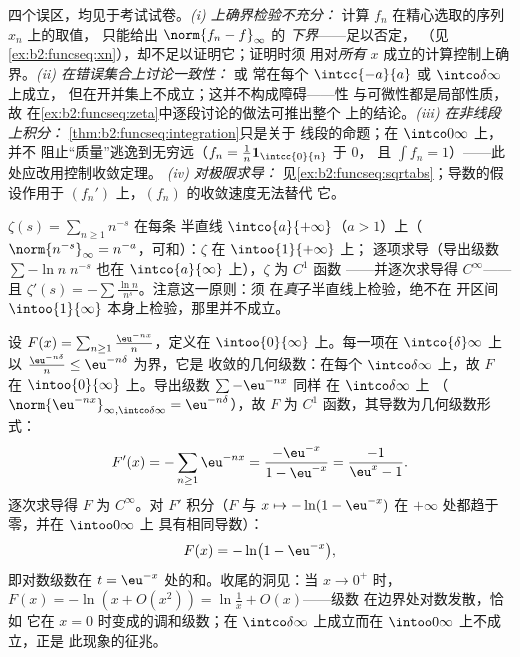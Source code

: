 \begin{remark}[常见误区]
四个误区，均见于考试试卷。\emph{(i)
上确界检验不充分：} 计算 $f_n$ 在精心选取的序列 $x_n$ 上的取值，
只能给出 $\norm{f_n - f}_\infty$ 的
\emph{下界}——足以否定，
（见\cref{ex:b2:funcseq:xn}），却不足以证明它；证明时须
用对\emph{所有} $x$ 成立的计算控制上确界。\emph{(ii)
在错误集合上讨论一致性：} 或
常在每个 $\intcc{-a}{a}$ 或 $\intco\delta\infty$ 上成立，
但在开并集上不成立；这并不构成障碍——性
与可微性都是局部性质，故
在\cref{ex:b2:funcseq:zeta}中逐段讨论的做法可推出整个
上的结论。\emph{(iii) 在非线段上积分：}
\cref{thm:b2:funcseq:integration}只是关于
线段的命题；在 $\intco0\infty$ 上，并不
阻止“质量”逃逸到无穷远（$f_n =
\frac1n\mathbf 1_{\intcc{0}{n}}$ 于 $0$，
且 $\int f_n = 1$）——此处应改用控制收敛定理。
\emph{(iv) 对极限求导：}
见\cref{ex:b2:funcseq:sqrtabs}；导数的假设作用于
$(f_n')$ 上，$(f_n)$ 的收敛速度无法替代
它。
\end{remark}

\begin{example}[黎曼 $\zeta$ 函数]\label{ex:b2:funcseq:zeta}
$\zeta(s) = \sum_{n\geq1} n^{-s}$ 在每条
半直线 $\intco{a}{+\infty}$（$a > 1$）上（$\norm{n^{-s}}_\infty =
n^{-a}$，可和）：$\zeta$ 在 $\intoo{1}{+\infty}$ 上；
逐项求导（导出级数 $\sum -\ln n\; n^{-s}$
也在 $\intco{a}{\infty}$ 上），$\zeta$ 为 $C^1$ 函数
——并逐次求导得 $C^\infty$——且 $\zeta'(s) = -\sum \frac{\ln
n}{n^s}$。注意这一原则：须
在\emph{真}子半直线上检验，绝不在
开区间 $\intoo{1}{\infty}$ 本身上检验，那里并不成立。
\end{example}

\begin{example}[一个对数级数的完整计算]\label{ex:b2:funcseq:logseries}
设 $F(x) = \sum_{n\geq1} \frac{\eu^{-nx}}{n}$，定义在
$\intoo{0}{\infty}$ 上。每一项在 $\intco{\delta}
\infty$ 上以 $\frac{\eu^{-n\delta}}{n} \leq \eu^{-n\delta}$ 为界，它是
收敛的几何级数：在每个
$\intco\delta\infty$ 上，故 $F$ 在
$\intoo{0}{\infty}$ 上。导出级数 $\sum -\eu^{-nx}$ 同样
在 $\intco\delta\infty$ 上
（$\norm{\eu^{-nx}}_{\infty,\intco\delta\infty} =
\eu^{-n\delta}$），故 $F$ 为 $C^1$ 函数，其导数为几何级数形式：
\[
F'(x) = -\sum_{n\geq1}\eu^{-nx}
= \frac{-\eu^{-x}}{1 - \eu^{-x}}
= \frac{-1}{\eu^{x} - 1} .
\]
逐次求导得 $F$ 为 $C^\infty$。对 $F'$ 积分（$F$ 与 $x
\mapsto -\ln(1 - \eu^{-x})$ 在 $+\infty$ 处都趋于零，并在 $\intoo0\infty$ 上
具有相同导数）：
\[
F(x) = -\ln\bigl(1 - \eu^{-x}\bigr),
\]
即对数级数在 $t = \eu^{-x}$ 处的和。收尾的洞见：当 $x
\to 0^+$ 时，$F(x) = -\ln(x + O(x^2)) = \ln\frac1x + O(x)$——级数
在边界处对数发散，恰如
它在 $x = 0$ 时变成的调和级数；在
$\intco\delta\infty$ 上成立而在 $\intoo0\infty$ 上不成立，正是
此现象的征兆。
\end{example}

